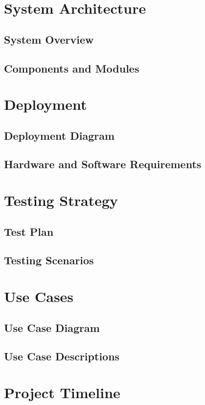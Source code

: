 \documentclass{report}
\begin{document}
\chapter{System Architecture}
\section{System Overview}
\section{Components and Modules}

\chapter{Deployment}
\section{Deployment Diagram}
\section{Hardware and Software Requirements}

\chapter{Testing Strategy}
\section{Test Plan}
\section{Testing Scenarios}

\chapter{Use Cases}
\section{Use Case Diagram}
\section{Use Case Descriptions}

\chapter{Project Timeline}
\end{document}
